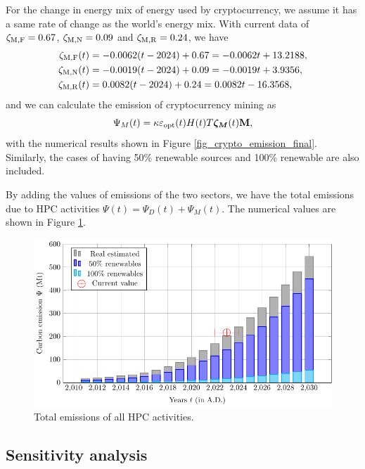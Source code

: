 \documentclass[12pt]{article}
\begin{document}
For the change in energy mix of energy used by cryptocurrency, we assume it has a same rate of change as the world's energy mix. With current data of $\zeta_{\rm M, F} = 0.67$, $\zeta_{\rm M, N} = 0.09$ and $\zeta_{\rm M, R} = 0.24$, we have
\begin{equation}
	\begin{aligned}
		\zeta_{\rm M, F}(t) &= -0.0062(t - 2024) + 0.67 = -0.0062t + 13.2188, \\
		\zeta_{\rm M, N}(t) &= -0.0019(t - 2024) + 0.09 = -0.0019t + 3.9356, \\
		\zeta_{\rm M, R}(t) &= 0.0082(t - 2024) + 0.24 = 0.0082t - 16.3568, \\
	\end{aligned}
\end{equation}
and we can calculate the  emission of cryptocurrency mining as
\begin{equation}
	\Psi_M(t) = \kappa \varepsilon_{\rm opt}(t) H(t) T \boldsymbol{\zeta_M}(t) \vb{M},
\end{equation}
with the numerical results shown in Figure \ref{fig_crypto_emission_final}. Similarly, the cases of having 50\% renewable sources and 100\% renewable are also included.

By adding the values of  emissions of the two sectors, we have the total  emissions due to HPC activities $\Psi(t) = \Psi_D(t) + \Psi_M(t)$. The numerical values are shown in Figure \ref{fig_emission_final}.

\begin{figure}[!t]
	\centering
	\includegraphics{figures/trends/emission.pdf}
	\caption{Total  emissions of all HPC activities.}
	\label{fig_emission_final}
\end{figure}

\subsection{Sensitivity analysis}
\end{document}
